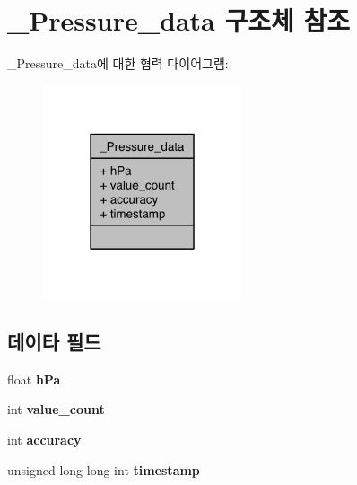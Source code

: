 \hypertarget{struct___pressure__data}{\section{\-\_\-\-Pressure\-\_\-data 구조체 참조}
\label{struct___pressure__data}
}


\-\_\-\-Pressure\-\_\-data에 대한 협력 다이어그램\-:\nopagebreak
\begin{figure}[H]
\begin{center}
\leavevmode
\includegraphics[width=166pt]{df/d4e/struct___pressure__data__coll__graph}
\end{center}
\end{figure}
\subsection*{데이타 필드}
\begin{DoxyCompactItemize}
\item 
\hypertarget{struct___pressure__data_af5bafbc5db27b95f2b41516f5f61336f}{float {\bfseries h\-Pa}}\label{struct___pressure__data_af5bafbc5db27b95f2b41516f5f61336f}

\item 
\hypertarget{struct___pressure__data_a40a079bfc72408819dc78da308203a74}{int {\bfseries value\-\_\-count}}\label{struct___pressure__data_a40a079bfc72408819dc78da308203a74}

\item 
\hypertarget{struct___pressure__data_a5565cf9073275f9713f9016e7c10d25f}{int {\bfseries accuracy}}\label{struct___pressure__data_a5565cf9073275f9713f9016e7c10d25f}

\item 
\hypertarget{struct___pressure__data_a8de02c4128636a7bf630ff5428f60c8d}{unsigned long long int {\bfseries timestamp}}\label{struct___pressure__data_a8de02c4128636a7bf630ff5428f60c8d}

\end{DoxyCompactItemize}


